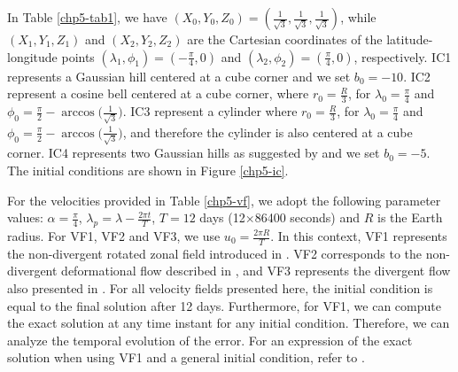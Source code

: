 In Table \ref{chp5-tab1}, we have $(X_0,Y_0,Z_0)=(\frac{1}{\sqrt{3}},\frac{1}{\sqrt{3}},\frac{1}{\sqrt{3}})$, while 
$(X_1,Y_1,Z_1)$ and $(X_2,Y_2,Z_2)$ are the Cartesian coordinates of the latitude-longitude points
$(\lambda_1,\phi_1) = (-\frac{\pi}{4},0)$ and
$(\lambda_2,\phi_2) = ( \frac{\pi}{4},0)$, respectively.
IC1 represents a Gaussian hill centered at a cube corner and we set $b_0 = -10$.
IC2 represent a cosine bell centered at a cube corner, where $r_0 = \frac{R}{3}$, 
for $\lambda_0=\frac{\pi}{4}$ and $\phi_0 = \frac{\pi}{2}-\arccos{\big(\frac{1}{\sqrt{3}}\big)}$.
IC3 represent a cylinder where $r_0 = \frac{R}{3}$, 
for $\lambda_0=\frac{\pi}{4}$ and $\phi_0 = \frac{\pi}{2}-\arccos{\big(\frac{1}{\sqrt{3}}\big)}$,
and therefore the cylinder is also centered at a cube corner.
IC4 represents two Gaussian hills as suggested by \citet{nair:2010} and we set $b_0 = -5$.
The initial conditions are shown in Figure \ref{chp5-ic}.

For the velocities provided in Table \ref{chp5-vf}, we adopt the following parameter values: 
$\alpha=\frac{\pi}{4}$, $\lambda_p=\lambda-\frac{2\pi t}{T}$, $T=12$ days (12$\times$86400 seconds) and $R$ is the Earth radius.
For VF1, VF2 and VF3, we use $u_0 = \frac{2\pi R}{T}$.
In this context, VF1 represents the non-divergent rotated zonal field introduced in \citet{will:1992}.
VF2 corresponds to the non-divergent deformational flow described in \citet{nair:2010},
and VF3 represents the divergent flow also presented in \citet{nair:2010}.
For all velocity fields presented here, the initial condition is equal to the final solution after 12 days.
Furthermore, for VF1, we can compute the exact solution at any time instant for any initial condition.
Therefore, we can analyze the temporal evolution of the error.
For an expression of the exact solution when using VF1 and a general initial condition, refer to \citet[Theorem 5.1, p. 155]{brachet:2018}.

